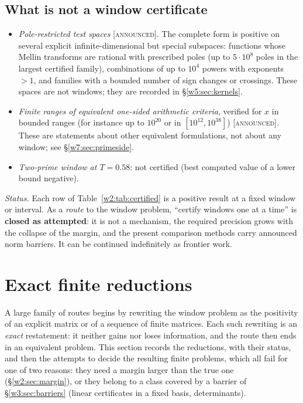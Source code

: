 \documentclass[11pt]{amsart}
\theoremstyle{definition}
\theoremstyle{remark}
\numberwithin{equation}{section}
\newcommand{\stag}[1]{\textsc{[#1]}}
\newcommand{\ANNOUNCED}{\stag{announced}}
\newcommand{\rtag}[1]{\textbf{\small\textsf{#1}}}
\newcommand{\closedA}{\rtag{closed as attempted}}
\newcommand{\entry}[1]{\par\smallskip\noindent\textit{#1.}\enspace}
\begin{document}
\subsection{What is not a window certificate}

\begin{itemize}
\item \emph{Pole-restricted test spaces} \ANNOUNCED. The complete form is positive on several explicit infinite-dimensional
but special subspaces: functions whose Mellin transforms are rational with prescribed poles (up to $5\cdot10^8$ poles in
the largest certified family), combinations of up to $10^4$ powers with exponents $>1$, and families with a bounded
number of sign changes or crossings. These spaces are not windows; they are recorded in \S\ref{w5:sec:kernels}.
\item \emph{Finite ranges of equivalent one-sided arithmetic criteria}, verified for $x$ in bounded ranges (for instance
up to $10^{20}$ or in $[10^{12},10^{38}]$) \ANNOUNCED. These are statements about other equivalent formulations, not
about any window; see \S\ref{w7:sec:primeside}.
\item \emph{Two-prime window at $T=0.58$}: not certified (best computed value of a lower bound negative).
\end{itemize}

\entry{Status} Each row of Table~\ref{w2:tab:certified} is a positive result at a fixed window or interval. As a
\emph{route} to the window problem, ``certify windows one at a time'' is \closedA: it is not a mechanism, the required precision grows with the collapse of the margin, and the
present comparison methods carry announced norm barriers. It can be continued indefinitely as frontier work.


\section{Exact finite reductions}\label{w2:sec:reductions}

A large family of routes begins by rewriting the window problem as the positivity of an explicit matrix or of a
sequence of finite matrices. Each such rewriting is an \emph{exact} restatement: it neither gains nor loses
information, and the route then ends in an equivalent problem. This section records the reductions, with their status,
and then the attempts to decide the resulting finite problems, which all fail for one of two reasons: they need a margin
larger than the true one (\S\ref{w2:sec:margin}), or they belong to a class covered by a barrier of \S\ref{w3:sec:barriers}
(linear certificates in a fixed basis, determinants).
\end{document}
